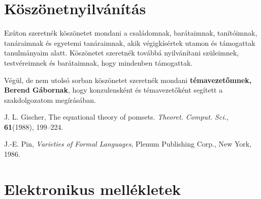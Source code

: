 \documentclass[12pt]{report}
\theoremstyle{definition}
\begin{document}
\chapter*{Köszönetnyilvánítás}

Ezúton szeretnék köszönetet mondani a családomnak, barátaimnak, tanítóimnak, tanáraimnak és egyetemi tanáraimnak, akik végigkísértek utamon és támogattak tanulmányaim alatt. Köszönetet szeretnék továbbá nyilvánítani szüleimnek, testvéreimnek és barátaimnak, hogy mindenben támogattak.

Végül, de nem utolsó sorban köszönetet szeretnék mondani \textbf{témavezetőmnek, Berend Gábornak}, hogy konzulensként és témavezetőként segített a szakdolgozatom megírásában.


%
%


\begin{thebibliography}{9}





J. L. Gischer,
The equational theory of pomsets.
\emph{Theoret. Comput. Sci.}, \textbf{61}(1988), 199--224.

J.-E. Pin,
\emph{Varieties of Formal Languages},
Plenum Publishing Corp., New York, 1986.





\end{thebibliography}

\chapter*{Elektronikus mellékletek}
\end{document}
